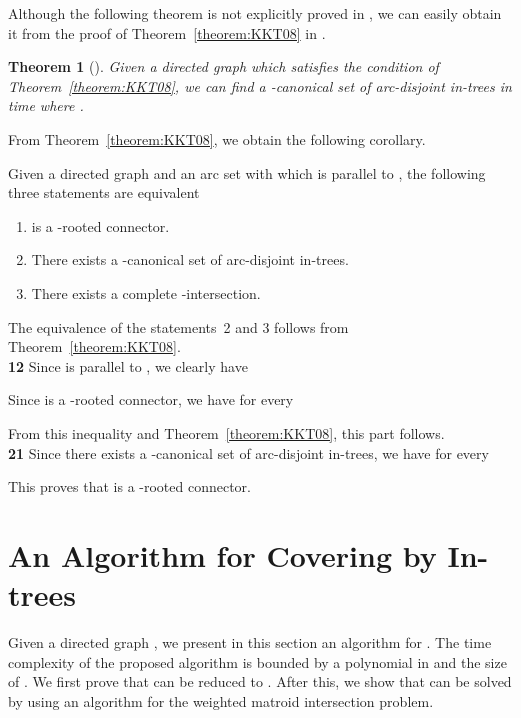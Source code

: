 \documentclass[11pt]{article}
\newcounter{ni}
\theoremstyle{plain}
\newtheorem{theorem}{Theorem}[section]
\newcommand{\eop}{\hfill \usebox{\ProofSym}}
\newenvironment{proof}{\noindent {\it Proof.}}{\eop\par\vspace{0.3cm}}
\begin{document}
Although the following theorem is not explicitly proved in \cite{KKT08},
we can easily obtain it from the proof of Theorem~\ref{theorem:KKT08} in \cite{KKT08}. 

\begin{theorem}[\cite{KKT08}] \label{theorem2:KKT08}
Given a directed graph   which satisfies the condition of 
Theorem~\ref{theorem:KKT08}, we can find a -canonical set of arc-disjoint
in-trees in  time where .
\end{theorem}

From Theorem~\ref{theorem:KKT08}, we obtain the following corollary. 

\begin{corollary} \label{corollary:KKT08}
Given a directed graph   and an arc set  with  
which is parallel to 
, the following three statements are equivalent
\begin{enumerate}
\item  is a -rooted connector.
\item There exists a -canonical set of arc-disjoint in-trees. 
\item There exists a complete -intersection. 
\end{enumerate}
\end{corollary}
\begin{proof}
The equivalence of the statements~2 and 3 follows from Theorem~\ref{theorem:KKT08}.\\
{\bf 12}
Since  is parallel to , we clearly have 

Since  is a -rooted connector,
we have for every 

From this inequality and Theorem~\ref{theorem:KKT08}, 
this part follows. \\
{\bf 21}
Since there exists a -canonical set of  
arc-disjoint in-trees,
we have for every 

This proves that  is a -rooted connector.
\end{proof}

\section{An Algorithm for Covering by In-trees}
\label{Algorithm}

Given a directed graph  , we present in this section an algorithm for . 
The time complexity of the proposed algorithm is bounded by a polynomial in  and the size of . 
We first prove that  can be reduced to . 
After this, we show that  can be solved by using 
an algorithm for the weighted matroid intersection problem. 
\end{document}
